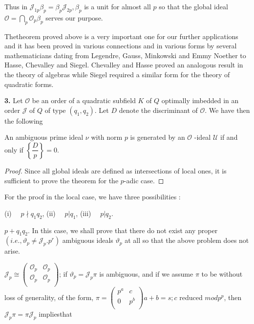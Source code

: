 Thus in $ \mathcal{J}_{1p} \beta_p = \beta_p \mathcal{J}_{2p},
\beta_p $ is a unit for almost all $p$  so that the global ideal $
\mathscr{O} = \bigcap \limits_{p} \mathscr{O}_p \beta_p $ serves our
purpose. 

\begin{remark*}
  The\pageoriginale theorem proved above is a very important one for our further
  applications and it has been proved in various connections and in
  various forms by several mathematicians dating from Legendre, Gauss,
  Minkowski and Emmy  Noether to Hasse, Chevalley and
  Siegel. Chevalley and Hasse proved an analogous result in the
  theory of algebras while Siegel required a similar form for the
  theory of quadratic forms. 
\end{remark*}

\textbf{3.} Let $ \mathscr{O} $ be an order of a quadratic subfield $K$  of
  $Q$ optimally imbedded in an order $ \mathcal{J} $  of $Q$  of type
  $ ( q_1,q_2 ) $. Let $D$ denote  the discriminant of $ \mathscr{O}
  $. We have then the following  


\begin{theorem}\label{chap4:sec9:thm5}%
  An ambiguous prime ideal $ \nu $ with norm $p$ is generated by an $
  \mathscr{O} $ -ideal $ \mathscr{U} $ if and only if $ \left\{
  \dfrac{D}{p} \right\} = 0 $. 
\end{theorem} 

\begin{proof}
  Since all global ideals are defined as intersections of local ones,
  it is sufficient to prove the theorem for the $p$-adic case. 
\end{proof}

For the proof in the local case, we have three possibilities :

(i)~~ $p \nmid q_1 q_2$,  \qquad (ii)~~ $p|q_1$, \qquad (iii)~~ $p | q_2$. 

\setcounter{case}{0}
\begin{case}[(i) ]%
  $p+q_1 q_2$. In this case, we shall prove that there do not
  exist any proper $ ( i.e., \vartheta_p \neq \mathcal{J}_p. p^r ) $
  ambiguous ideals $ \vartheta_p $ at all so that the above problem
  does not arise.  
\end{case}

$ \mathcal{J}_{p} \cong \begin{pmatrix} \mathscr{O}_p &
  \mathscr{O}_p \\ \mathscr{O}_p & \mathscr{O}_p \\ \end{pmatrix} $;
if $ \vartheta_p = \mathcal{J}_p \pi $ is ambiguous, and if we assume
$ \pi $  to be without loss of generality, of the  form, $ \pi
=  \begin{pmatrix} p^a & c \\ 0 & p^b \\ \end{pmatrix} a + b = s; c $
reduced  $ mod p^p $, then $ \mathcal{J}_p \pi = \pi \mathcal{J}_p $
implies\pageoriginale that  

